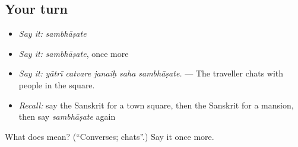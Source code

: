 \subsection*{Your turn}
\begin{itemize}
\raggedright
  \item \emph{Say it:} \emph{sambhāṣate}
  \item \emph{Say it:} \emph{sambhāṣate}, once more
  \item \emph{Say it:} \emph{yātrī catvare janaiḥ saha sambhāṣate.} — The traveller chats with people in the square.
  \item \emph{Recall:} say the Sanskrit for a town square, then the Sanskrit for a mansion, then say \emph{sambhāṣate} again
\end{itemize}

\begin{tcolorbox}[breakable,colback=teal!4,colframe=teal!35!black,title={Before you move on}]
What does  mean? (\textquotedblleft{}Converses; chats\textquotedblright{}.) Say it once more.
\end{tcolorbox}

